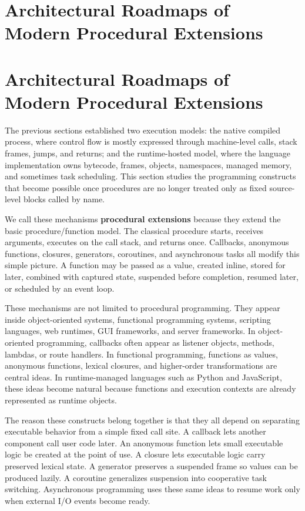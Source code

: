 \section{Architectural Roadmaps of Modern Procedural Extensions}


\section{Architectural Roadmaps of Modern Procedural Extensions}

The previous sections established two execution models: the native compiled process, where control flow is mostly expressed through machine-level calls, stack frames, jumps, and returns; and the runtime-hosted model, where the language implementation owns bytecode, frames, objects, namespaces, managed memory, and sometimes task scheduling. This section studies the programming constructs that become possible once procedures are no longer treated only as fixed source-level blocks called by name.

We call these mechanisms \textbf{procedural extensions} because they extend the basic procedure/function model. The classical procedure starts, receives arguments, executes on the call stack, and returns once. Callbacks, anonymous functions, closures, generators, coroutines, and asynchronous tasks all modify this simple picture. A function may be passed as a value, created inline, stored for later, combined with captured state, suspended before completion, resumed later, or scheduled by an event loop.

These mechanisms are not limited to procedural programming. They appear inside object-oriented systems, functional programming systems, scripting languages, web runtimes, GUI frameworks, and server frameworks. In object-oriented programming, callbacks often appear as listener objects, methods, lambdas, or route handlers. In functional programming, functions as values, anonymous functions, lexical closures, and higher-order transformations are central ideas. In runtime-managed languages such as Python and JavaScript, these ideas become natural because functions and execution contexts are already represented as runtime objects.

The reason these constructs belong together is that they all depend on separating executable behavior from a simple fixed call site. A callback lets another component call user code later. An anonymous function lets small executable logic be created at the point of use. A closure lets executable logic carry preserved lexical state. A generator preserves a suspended frame so values can be produced lazily. A coroutine generalizes suspension into cooperative task switching. Asynchronous programming uses these same ideas to resume work only when external I/O events become ready.

